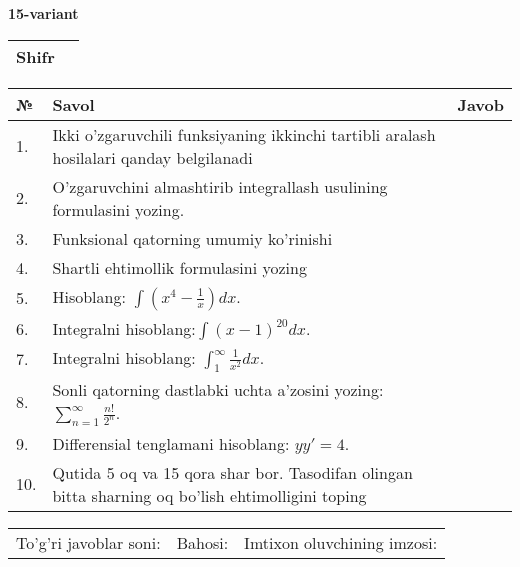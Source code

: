 \documentclass{article}
\begin{document}
  \egroup
  
  \newpage
  
  
  \textbf{15-variant}\\
  
  \bgroup
  \def\arraystretch{1.6} %
  
  \begin{tabular}{|m{5.7cm}|m{9.5cm}|}
  \hline
  Shifr & \\
  \hline
  \end{tabular}
  
  \vspace{1cm}
  
  \begin{tabular}{|m{0.7cm}|m{10cm}|m{4cm}|}
  \hline
  № & Savol & Javob \\
  \hline
  1. & Ikki o'zgaruvchili funksiyaning ikkinchi tartibli aralash hosilalari qanday belgilanadi &  \\
  \hline
  2. & O'zgaruvchini almashtirib integrallash usulining formulasini yozing. &  \\
  \hline
  3. & Funksional qatorning umumiy ko'rinishi &  \\
  \hline
  4. & Shartli ehtimollik formulasini yozing &  \\
  \hline
  5. & Hisoblang: \(\int \left( x^{4} - \frac{1}{x} \right)dx\). &  \\
  \hline
  6. & Integralni hisoblang:\(\int {(x - 1)^{20}}dx\). &  \\
  \hline
  7. & Integralni hisoblang: \(\int_{1}^{\infty}{\frac{1}{x^{2}}dx}\). &  \\
  \hline
  8. & Sonli qatorning dastlabki uchta a'zosini yozing: \(\sum_{n = 1}^{\infty}\frac{n!}{2^{n}}\). &  \\
  \hline
  9. & Differensial tenglamani hisoblang: \(yy' = 4\). &  \\
  \hline
  10. & Qutida 5 oq va 15 qora shar bor. Tasodifan olingan bitta sharning oq bo'lish ehtimolligini toping &  \\
  \hline
  \end{tabular}
  
  \vspace{1cm}
  
  \begin{tabular}{lll}
  To'g'ri javoblar soni: \underline{\hspace{1.5cm}} & 
  Bahosi: \underline{\hspace{1.5cm}} & 
  Imtixon oluvchining imzosi: \underline{\hspace{2cm}} \\
  \end{tabular}
  
\end{document}
